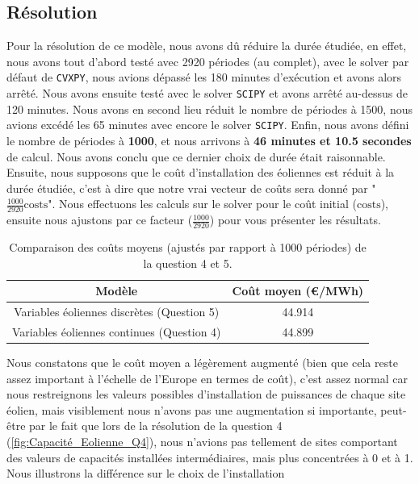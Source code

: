 \documentclass{article}
\begin{document}
\subsection*{Résolution}
Pour la résolution de ce modèle, nous avons dû réduire la durée étudiée, en effet, nous avons tout d'abord
testé avec 2920 périodes (au complet), avec le solver par défaut de \verb|CVXPY|, nous avions dépassé les 180 minutes
d'exécution et avons alors arrêté. Nous avons ensuite testé avec le solver \verb|SCIPY| et avons arrêté au-dessus de 120
minutes. Nous avons en second lieu réduit le nombre de périodes à 1500, nous avions excédé les 65
minutes avec encore le solver \verb|SCIPY|. Enfin, nous avons défini le nombre de périodes à \textbf{1000}, et nous arrivons
à \textbf{46 minutes et 10.5 secondes} de calcul. Nous avons conclu que ce dernier choix de durée était raisonnable.
Ensuite, nous supposons que le coût d'installation des éoliennes
est réduit à la durée étudiée, c'est à dire que notre vrai vecteur de coûts sera donné par "$\frac{1000}{2920} \mathrm{costs}$".
Nous effectuons les calculs sur le solver pour le coût initial ($\mathrm{costs}$), ensuite nous ajustons 
par ce facteur ($\frac{1000}{2920}$) pour vous présenter les résultats.
\begin{table}[H]
    \centering
    \renewcommand{\arraystretch}{1.5}%
    \begin{tabular}{|c | c |} 
        \hline
        Modèle & Coût moyen (€/MWh) \\
        \hline
        Variables éoliennes discrètes (Question 5) & 44.914 \\
        \hline
        Variables éoliennes continues (Question 4) & 44.899 \\
        \hline
    \end{tabular}
    \caption{Comparaison des coûts moyens (ajustés par rapport à 1000 périodes) de la question 4 et 5.}
    \label{table:comparaison_resultat_Q5_Q4_1000}
\end{table} 
\noindent Nous constatons que le coût moyen a légèrement augmenté (bien que cela reste assez important à l'échelle
de l'Europe en termes de coût), c'est assez normal car nous restreignons les valeurs possibles d'installation 
de puissances de chaque site éolien, mais visiblement nous n'avons pas une augmentation si importante, peut-être par le fait 
que lors de la résolution de la question 4 (\autoref{fig:Capacité_Eolienne_Q4}), nous n'avions pas tellement de sites
comportant des valeurs de capacités installées intermédiaires, mais plus concentrées à 0 et à 1. Nous illustrons la différence sur le choix de l'installation 
\end{document}

